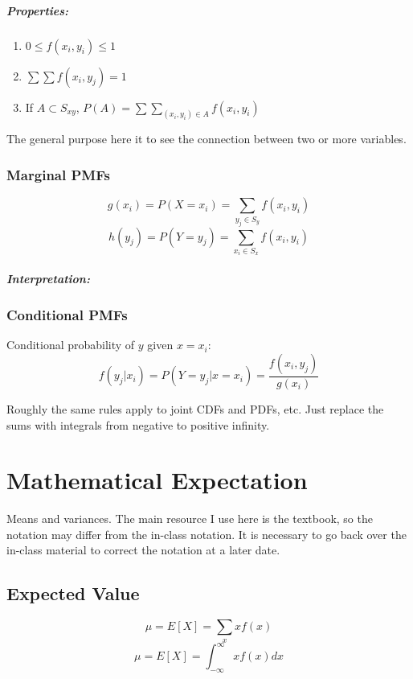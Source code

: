 \documentclass[a4paper,12pt]{report}
\begin{document}
\paragraph{Properties: } 
\begin{enumerate}
\item $0 \leq f(x_i, y_i) \leq 1$
\item $\sum\sum f(x_i, y_j) = 1$
\item If $A\subset S_{xy}$, $P(A) = \sum\sum_{(x_i, y_i) \in A} f(x_i, y_i)$
\end{enumerate}

The general purpose here it to see the connection between two or more variables. 

\subsection{Marginal PMFs}
$$g(x_i) = P(X = x_i) = \sum_{y_j \in S_y} f(x_i, y_i)$$
$$h(y_j) = P(Y = y_j) = \sum_{x_i \in S_x} f(x_i, y_i)$$

\paragraph{Interpretation: } %

\subsection{Conditional PMFs}
Conditional probability of $y$ given $x = x_i$:
$$f(y_j | x_i) = P(Y = y_j | x = x_i) = \frac{f(x_i, y_j)}{g(x_i)}$$

Roughly the same rules apply to joint CDFs and PDFs, etc. Just replace the sums with integrals from negative 
to positive infinity.

\chapter{Mathematical Expectation}

Means and variances. The main resource I use here is the textbook, so the notation may differ from the in-class notation. It is necessary to go back over the in-class material to correct the notation at a later date.

\section{Expected Value}

$$\mu = E[X] = \sum_x xf(x)$$
$$\mu = E[X] = \int_{-\infty}^{\infty} xf(x) dx$$
\end{document}
